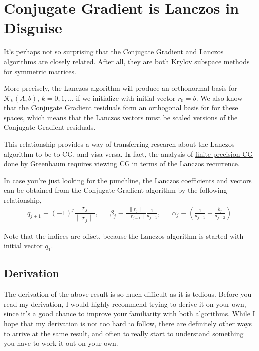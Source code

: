 \hypertarget{conjugate-gradient-is-lanczos-in-disguise}{%
\section{Conjugate Gradient is Lanczos in
Disguise}\label{conjugate-gradient-is-lanczos-in-disguise}}

It's perhaps not so surprising that the Conjugate Gradient and Lanczos
algorithms are closely related. After all, they are both Krylov subspace
methods for symmetric matrices.

More precisely, the Lanczos algorithm will produce an orthonormal basis
for \(\mathcal{K}_k(A,b)\), \(k=0,1,\ldots\) if we initialize with
initial vector \(r_0 = b\). We also know that the Conjugate Gradient
residuals form an orthogonal basis for for these spaces, which means
that the Lanczos vectors must be scaled versions of the Conjugate
Gradient residuals.

This relationship provides a way of transferring research about the
Lanczos algorithm to be to CG, and visa versa. In fact, the analysis of
\href{./finite_precision_cg.html}{finite precision CG} done by Greenbaum
requires viewing CG in terms of the Lanczos recurrence.

In case you're just looking for the punchline, the Lanczos coefficients
and vectors can be obtained from the Conjugate Gradient algorithm by the
following relationship, \begin{align*}
q_{j+1} \equiv (-1)^j\dfrac{r_j}{\|r_j\|}
,&&
\beta_j \equiv \frac{\|r_j\|}{\|r_{j-1}\|}\frac{1}{a_{j-1}}
,&&
\alpha_j \equiv \left(\frac{1}{a_{j-1}} + \frac{b_{j}}{a_{j-2}}\right)
\end{align*}

Note that the indices are offset, because the Lanczos algorithm is
started with initial vector \(q_1\).

\hypertarget{derivation}{%
\subsection{Derivation}\label{derivation}}

The derivation of the above result is so much difficult as it is
tedious. Before you read my derivation, I would highly recommend trying
to derive it on your own, since it's a good chance to improve your
familiarity with both algorithms. While I hope that my derivation is not
too hard to follow, there are definitely other ways to arrive at the
same result, and often to really start to understand something you have
to work it out on your own.


